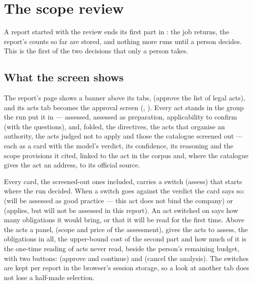 \section{The scope review}\label{sec:report:scope}

A report started with the review ends its first part in : the job returns,
the report's counts so far are stored, and nothing more runs until a person decides. This is
the first of the two decisions that only a person takes.

\subsection{What the screen shows}

The report's page shows a banner above its tabs, 
(approve the list of legal acts), and its acts tab becomes the approval screen
(, ). Every act stands
in the group the run put it in --- assessed, assessed as preparation, applicability to confirm
(with the questions), and, folded, the directives, the acts that organise an authority, the
acts judged not to apply and those the catalogue screened out --- each as a card with the
model's verdict, its confidence, its reasoning and the scope provisions it cited, linked to
the act in the corpus and, where the catalogue gives the act an address, to its official
source.

Every card, the screened-out ones included, carries a switch  (assess) that starts
where the run decided. When a switch goes against the verdict the card says so:  (will be assessed as good
practice --- this act does not bind the company) or  (applies, but will not be assessed in this report). An act switched on says how
many obligations it would bring, or that it will be read for the first time. Above the acts a
panel,  (scope and price of the assessment), gives the acts to
assess, the obligations in all, the upper-bound cost of the second part and how much of it is
the one-time reading of acts never read, beside the person's remaining budget, with two
buttons:  (approve and continue) and  (cancel the
analysis). The switches are kept per report in the browser's session storage, so a look at
another tab does not lose a half-made selection.

